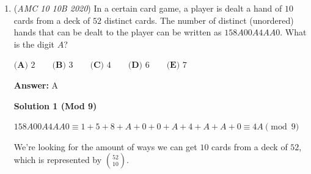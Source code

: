 \begin{enumerate}
 (Solution by CircleOO)

 



\textbf{Solution 8 (Easier Solution)}

Basically, George is picking a ball and adding another ball of that color to the urn. Basically, he needs to pick a red ball twice and a blue ball twice to get 3 red and 3 blue balls in the urn. The number of ways to choose a red ball twice is $1\cdot 2$ (at the start there's 1 red ball, then he needs to choose it again when there's 2, and then there is 3 red balls so he doesn't need to choose it again). Similarly the number of ways to choose blue balls twice is 2. $2\cdot 2$ = 4 ways to choose 2 red balls and 2 blue balls (not considering order). The total number of ways is $2\cdot 3\cdot 4\cdot 5$. Adding order to the 4 ways to choose 2 red and 2 blue balls, it is 4C2 because out of the 4 ball choosings, 2 of them must be red, and we automatically make the other ones blue. $\frac{\binom42 \cdot 2 \cdot 2}{2 \cdot 3 \cdot 4 \cdot 5} = \frac{1}{5}$.

 



\textbf{Solution 9 (Desperate Guess)}

Notice that the answer can either be (1R, 5B) (2R, 4B) (3R, 3B) (4R, 2B) or (5R, 1B). Also, the answer choices are all really basic. Just guess that each of these cases are equal by symmetry so the probability of (3R, 3B) is $\boxed{\textbf{(B)}\ \frac{1}{5}}$.

 -unhappyfarmer

 


	\item (\textit{AMC 10 10B 2020}) In a certain card game, a player is dealt a hand of $10$ cards from a deck of $52$ distinct cards. The number of distinct (unordered) hands that can be dealt to the player can be written as $158A00A4AA0$. What is the digit $A$?


 $\textbf{(A) } 2 \qquad\textbf{(B) } 3 \qquad\textbf{(C) } 4 \qquad\textbf{(D) } 6 \qquad\textbf{(E) } 7$

 \textbf{Answer: }A



\textbf{Solution 1 (Mod 9)}

$158A00A4AA0 \equiv 1+5+8+A+0+0+A+4+A+A+0 \equiv 4A \pmod{9}$

 We're looking for the amount of ways we can get $10$ cards from a deck of $52$, which is represented by $\binom{52}{10}$.


\end{enumerate}
